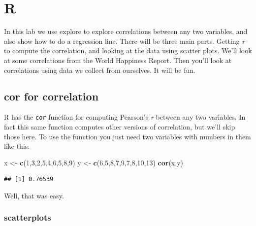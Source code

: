 \documentclass[
]{book}
\newenvironment{Shaded}{\begin{snugshade}}{\end{snugshade}}
\newcommand{\DecValTok}[1]{\textcolor[rgb]{0.00,0.00,0.81}{#1}}
\newcommand{\FunctionTok}[1]{\textcolor[rgb]{0.13,0.29,0.53}{\textbf{#1}}}
\newcommand{\NormalTok}[1]{#1}
\newcommand{\OtherTok}[1]{\textcolor[rgb]{0.56,0.35,0.01}{#1}}
\begin{document}
\hypertarget{r-6}{%
\section{R}\label{r-6}}

In this lab we use explore to explore correlations between any two variables, and also show how to do a regression line. There will be three main parts. Getting \emph{r} to compute the correlation, and looking at the data using scatter plots. We'll look at some correlations from the World Happiness Report. Then you'll look at correlations using data we collect from ourselves. It will be fun.

\hypertarget{cor-for-correlation}{%
\subsection{cor for correlation}\label{cor-for-correlation}}

R has the \texttt{cor} function for computing Pearson's \emph{r} between any two variables. In fact this same function computes other versions of correlation, but we'll skip those here. To use the function you just need two variables with numbers in them like this:

\begin{Shaded}
\begin{Highlighting}[]
\NormalTok{x  }\OtherTok{\textless{}{-}} \FunctionTok{c}\NormalTok{(}\DecValTok{1}\NormalTok{,}\DecValTok{3}\NormalTok{,}\DecValTok{2}\NormalTok{,}\DecValTok{5}\NormalTok{,}\DecValTok{4}\NormalTok{,}\DecValTok{6}\NormalTok{,}\DecValTok{5}\NormalTok{,}\DecValTok{8}\NormalTok{,}\DecValTok{9}\NormalTok{)}
\NormalTok{y  }\OtherTok{\textless{}{-}} \FunctionTok{c}\NormalTok{(}\DecValTok{6}\NormalTok{,}\DecValTok{5}\NormalTok{,}\DecValTok{8}\NormalTok{,}\DecValTok{7}\NormalTok{,}\DecValTok{9}\NormalTok{,}\DecValTok{7}\NormalTok{,}\DecValTok{8}\NormalTok{,}\DecValTok{10}\NormalTok{,}\DecValTok{13}\NormalTok{)}
\FunctionTok{cor}\NormalTok{(x,y)}
\end{Highlighting}
\end{Shaded}

\begin{verbatim}
## [1] 0.76539
\end{verbatim}

Well, that was easy.

\hypertarget{scatterplots-1}{%
\subsubsection{scatterplots}\label{scatterplots-1}}
\end{document}

